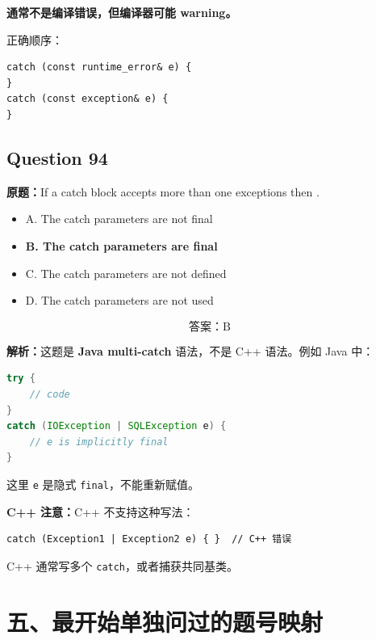 \documentclass[11pt, a4paper]{article}
\begin{document}
\textbf{通常不是编译错误，但编译器可能 warning。}

正确顺序：
\begin{lstlisting}
catch (const runtime_error& e) {
}
catch (const exception& e) {
}
\end{lstlisting}


\subsection*{Question 94}
\textbf{原题：}If a catch block accepts more than one exceptions then \underline{\hspace{2cm}}.
\begin{itemize}
    \item A. The catch parameters are not final
    \item \textbf{B. The catch parameters are final}
    \item C. The catch parameters are not defined
    \item D. The catch parameters are not used
\end{itemize}

\[
\boxed{\text{答案：B}}
\]

\textbf{解析：}这题是 \textbf{Java multi-catch} 语法，不是 C++ 语法。例如 Java 中：
\begin{lstlisting}[language=Java]
try {
    // code
}
catch (IOException | SQLException e) {
    // e is implicitly final
}
\end{lstlisting}
这里 \texttt{e} 是隐式 \texttt{final}，不能重新赋值。

\textbf{C++ 注意：}C++ 不支持这种写法：
\begin{lstlisting}
catch (Exception1 | Exception2 e) { }  // C++ 错误
\end{lstlisting}
C++ 通常写多个 \texttt{catch}，或者捕获共同基类。


\section*{五、最开始单独问过的题号映射}
\end{document}
